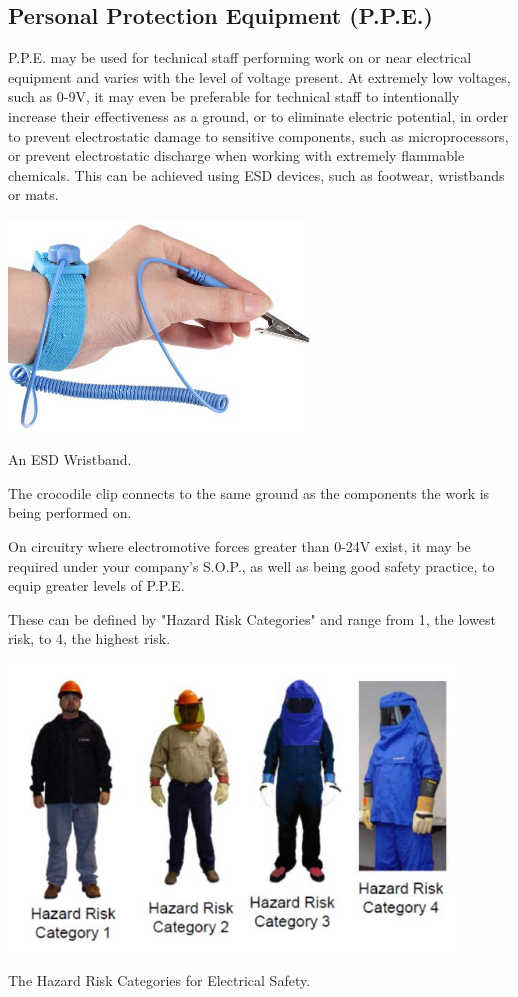 \documentclass[11pt,a4paper]{article}
\begin{document}
\subsection{Personal Protection Equipment (P.P.E.)}
P.P.E. may be used for technical staff performing work on or near electrical equipment and varies with the level of voltage present. At extremely low voltages, such as 0-9V, it may even be preferable for technical staff to intentionally increase their effectiveness as a ground, or to eliminate electric potential, in order to prevent electrostatic damage to sensitive components, such as microprocessors, or prevent electrostatic discharge when working with extremely flammable chemicals. This can be achieved using ESD devices, such as footwear, wristbands or mats.
\begin{center}
  \includegraphics[width=8cm]{esd.jpg}\par
An ESD Wristband.\par The crocodile clip connects to the same ground as the components the work is being performed on.
  \end{center}

On circuitry where electromotive forces greater than 0-24V exist, it may be required under your company's S.O.P., as well as being good safety practice, to equip greater levels of P.P.E.

These can be defined by "Hazard Risk Categories" and range from 1, the lowest risk, to 4, the highest risk.
\begin{center}
  \includegraphics[width=12cm]{riskcat.jpg}\par
The Hazard Risk Categories for Electrical Safety.
  \end{center}
\end{document}
